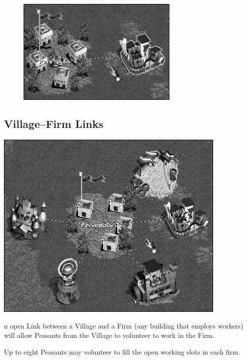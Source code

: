 \begin{figure}
	\vspace{-20pt}
	\begin{center}
		\includegraphics[width=0.7\textwidth]{Iactivelink_fort}
	\end{center}
	\vspace{-50pt}
\end{figure}

\clearpage

\subsection{Village–Firm Links}


\begin{center}
	\includegraphics[width=0.7\linewidth]{Imultilinks}
\end{center}

n open Link between a Village and a Firm (any building that employs workers) will allow Peasants from the Village to volunteer to work in the Firm.

Up to eight Peasants may volunteer to fill the open working slots in each firm.

